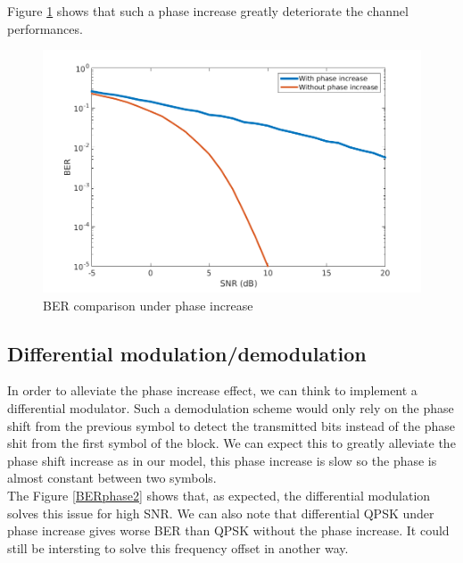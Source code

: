 \documentclass[a4paper,12pt]{article}
\begin{document}
Figure \ref{BERphase} shows that such a phase increase greatly deteriorate the channel performances.

\begin{figure}[ht!]
\centering
\begin{center}
\includegraphics[scale=0.50]{BER_phase_increase.png}
\caption{BER comparison under phase increase}
\label{BERphase}
\end{center}
\end{figure}

\subsection{Differential modulation/demodulation}
In order to alleviate the phase increase effect, we can think to implement a differential modulator. Such a demodulation scheme would only rely on the phase shift from the previous symbol to detect the transmitted bits instead of the phase shit from the first symbol of the block. We can expect this to greatly alleviate the phase shift increase as in our model, this phase increase is slow so the phase is almost constant between two symbols.\\

The Figure \ref{BERphase2} shows that, as expected, the differential modulation solves this issue for high SNR. We can also note that differential QPSK under phase increase gives worse BER than QPSK without the phase increase. It could still be intersting to solve this frequency offset in another way.
\end{document}
